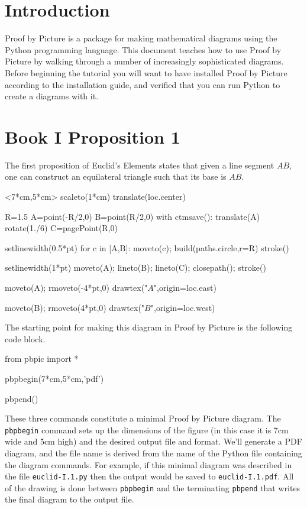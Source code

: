 \documentclass[12pt]{article}
\def\file#1{{\tt #1}}
\def\code#1{{\tt #1}}
\begin{document}
\section{Introduction}
Proof by Picture is a package for making mathematical diagrams
using the Python programming language.  This document teaches how to use 
Proof by Picture by walking through a number of
increasingly sophisticated diagrams.  Before beginning
the tutorial you will want to have installed Proof by Picture according to
the installation guide, and verified that you can run Python to
create a diagrams with it.

\section{Book I Proposition 1}
The first proposition of Euclid's Elements states that 
given a line segment $AB$, one can
construct an equilateral triangle such that
its base is $AB$.

\hfil\begin{pbpic}<7*cm,5*cm>
scaleto(1*cm)
translate(loc.center)

R=1.5
A=point(-R/2,0)
B=point(R/2,0)
with ctmsave():
  translate(A)
  rotate(1./6)
  C=pagePoint(R,0)

setlinewidth(0.5*pt)
for c in [A,B]:
  moveto(c); build(paths.circle,r=R)
  stroke()

setlinewidth(1*pt)
moveto(A); lineto(B); lineto(C); closepath();
stroke()

moveto(A); rmoveto(-4*pt,0)
drawtex("$A$",origin=loc.east)

moveto(B); rmoveto(4*pt,0)
drawtex("$B$",origin=loc.west)
\end{pbpic}

The starting point for making this diagram in Proof by Picture is the
following code block.
\begin{snippet}
from pbpic import *

pbpbegin(7*cm,5*cm,'pdf')

pbpend()
\end{snippet}
These three commands constitute a minimal Proof by Picture diagram.
The \code{pbpbegin} command sets up the dimensions of the figure
(in this case it is 7cm wide and 5cm high) and the desired output file
and format.  We'll generate a PDF diagram, and the file name is
derived from the name of the Python file containing the diagram commands.
For example, if this minimal diagram was described in the file \file{euclid-I.1.py} then the output would be saved to \file{euclid-I.1.pdf}.
All of the drawing is done between 
\code{pbpbegin} and  the terminating \code{pbpend}
that writes the final diagram to the output file.
\end{document}
